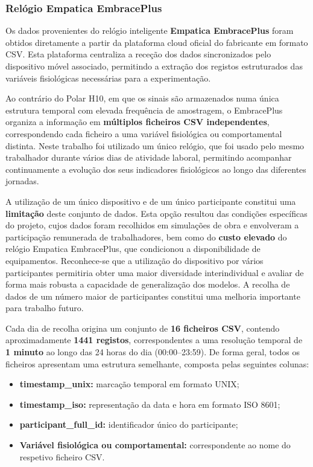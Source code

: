 \subsubsection*{Relógio Empatica EmbracePlus}

Os dados provenientes do relógio inteligente \textbf{Empatica EmbracePlus} foram obtidos diretamente a partir da plataforma cloud oficial do fabricante em formato CSV. Esta plataforma centraliza a receção dos dados sincronizados pelo dispositivo móvel associado, permitindo a extração dos registos estruturados das variáveis fisiológicas necessárias para a experimentação.

Ao contrário do Polar H10, em que os sinais são armazenados numa única estrutura temporal com elevada frequência de amostragem, o EmbracePlus organiza a informação em \textbf{múltiplos ficheiros CSV independentes}, correspondendo cada ficheiro a uma variável fisiológica ou comportamental distinta. Neste trabalho foi utilizado um único relógio, que foi usado pelo mesmo trabalhador durante vários dias de atividade laboral, permitindo acompanhar continuamente a evolução dos seus indicadores fisiológicos ao longo das diferentes jornadas.

A utilização de um único dispositivo e de um único participante constitui uma \textbf{limitação} deste conjunto de dados. Esta opção resultou das condições específicas do projeto, cujos dados foram recolhidos em simulações de obra e envolveram a participação remunerada de trabalhadores, bem como do \textbf{custo elevado} do relógio Empatica EmbracePlus, que condicionou a disponibilidade de equipamentos. Reconhece-se que a utilização do dispositivo por vários participantes permitiria obter uma maior diversidade interindividual e avaliar de forma mais robusta a capacidade de generalização dos modelos. A recolha de dados de um número maior de participantes constitui uma melhoria importante para trabalho futuro.

Cada dia de recolha origina um conjunto de \textbf{16 ficheiros CSV}, contendo aproximadamente \textbf{1441 registos}, correspondentes a uma resolução temporal de \textbf{1 minuto} ao longo das 24 horas do dia (00:00--23:59). De forma geral, todos os ficheiros apresentam uma estrutura semelhante, composta pelas seguintes colunas:

\begin{itemize}
\item \textbf{timestamp\_unix:} marcação temporal em formato UNIX;
\item \textbf{timestamp\_iso:} representação da data e hora em formato ISO 8601;
\item \textbf{participant\_full\_id:} identificador único do participante;
\item \textbf{Variável fisiológica ou comportamental:} correspondente ao nome do respetivo ficheiro CSV.
\end{itemize}

